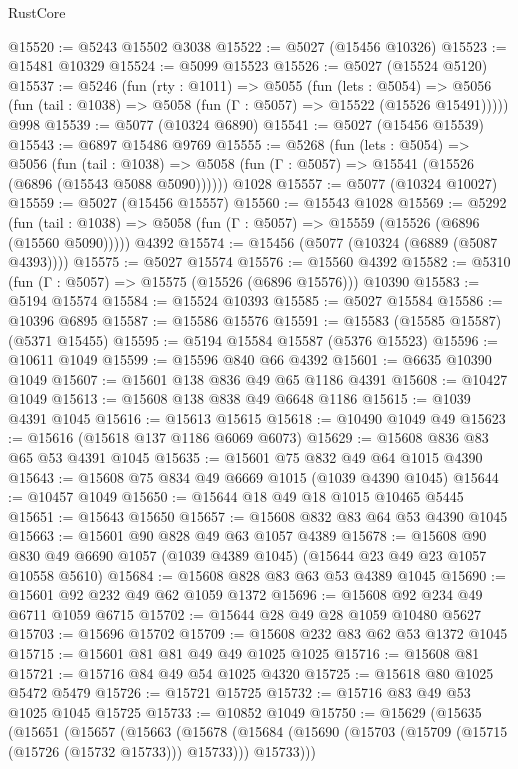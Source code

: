 \begin{lexlean}{RustCore}
\begin{coremodule}
@15520 := @5243 @15502 @3038
@15522 := @5027 (@15456 @10326)
@15523 := @15481 @10329
@15524 := @5099 @15523
@15526 := @5027 (@15524 @5120)
@15537 := @5246
    (fun (rty : @1011) =>
    @5055
      (fun (lets : @5054) =>
      @5056 (fun (tail : @1038) => @5058 (fun (Γ : @5057) => @15522 (@15526 @15491)))))
    @998
@15539 := @5077 (@10324 @6890)
@15541 := @5027 (@15456 @15539)
@15543 := @6897 @15486 @9769
@15555 := @5268
    (fun (lets : @5054) =>
    @5056
      (fun (tail : @1038) =>
      @5058 (fun (Γ : @5057) => @15541 (@15526 (@6896 (@15543 @5088 @5090))))))
    @1028
@15557 := @5077 (@10324 @10027)
@15559 := @5027 (@15456 @15557)
@15560 := @15543 @1028
@15569 := @5292
    (fun (tail : @1038) => @5058 (fun (Γ : @5057) => @15559 (@15526 (@6896 (@15560 @5090)))))
    @4392
@15574 := @15456 (@5077 (@10324 (@6889 (@5087 @4393))))
@15575 := @5027 @15574
@15576 := @15560 @4392
@15582 := @5310 (fun (Γ : @5057) => @15575 (@15526 (@6896 @15576))) @10390
@15583 := @5194 @15574
@15584 := @15524 @10393
@15585 := @5027 @15584
@15586 := @10396 @6895
@15587 := @15586 @15576
@15591 := @15583 (@15585 @15587) (@5371 @15455)
@15595 := @5194 @15584 @15587 (@5376 @15523)
@15596 := @10611 @1049
@15599 := @15596 @840 @66 @4392
@15601 := @6635 @10390 @1049
@15607 := @15601 @138 @836 @49 @65 @1186 @4391
@15608 := @10427 @1049
@15613 := @15608 @138 @838 @49 @6648 @1186
@15615 := @1039 @4391 @1045
@15616 := @15613 @15615
@15618 := @10490 @1049 @49
@15623 := @15616 (@15618 @137 @1186 @6069 @6073)
@15629 := @15608 @836 @83 @65 @53 @4391 @1045
@15635 := @15601 @75 @832 @49 @64 @1015 @4390
@15643 := @15608 @75 @834 @49 @6669 @1015 (@1039 @4390 @1045)
@15644 := @10457 @1049
@15650 := @15644 @18 @49 @18 @1015 @10465 @5445
@15651 := @15643 @15650
@15657 := @15608 @832 @83 @64 @53 @4390 @1045
@15663 := @15601 @90 @828 @49 @63 @1057 @4389
@15678 := @15608
    @90
    @830
    @49
    @6690
    @1057
    (@1039 @4389 @1045)
    (@15644 @23 @49 @23 @1057 @10558 @5610)
@15684 := @15608 @828 @83 @63 @53 @4389 @1045
@15690 := @15601 @92 @232 @49 @62 @1059 @1372
@15696 := @15608 @92 @234 @49 @6711 @1059 @6715
@15702 := @15644 @28 @49 @28 @1059 @10480 @5627
@15703 := @15696 @15702
@15709 := @15608 @232 @83 @62 @53 @1372 @1045
@15715 := @15601 @81 @81 @49 @49 @1025 @1025
@15716 := @15608 @81
@15721 := @15716 @84 @49 @54 @1025 @4320
@15725 := @15618 @80 @1025 @5472 @5479
@15726 := @15721 @15725
@15732 := @15716 @83 @49 @53 @1025 @1045 @15725
@15733 := @10852 @1049
@15750 := @15629
    (@15635
      (@15651
        (@15657
          (@15663
            (@15678
              (@15684 (@15690 (@15703 (@15709 (@15715 (@15726 (@15732 @15733))) @15733))) @15733)))

\end{coremodule}
\end{lexlean}
